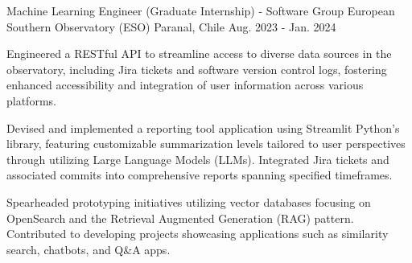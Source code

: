 

\begin{cventries}
  \cventry
    {Machine Learning Engineer (Graduate Internship) - Software Group} %
    {European Southern Observatory (ESO)} %
    {Paranal, Chile} %
    {Aug. 2023 - Jan. 2024} %
    {
      \begin{cvitems} %
        \item {Engineered a RESTful API to streamline access to diverse data sources in the observatory, including Jira tickets and software version control logs, fostering enhanced accessibility and integration of user information across various platforms.}
        \item {Devised and implemented a reporting tool application using Streamlit Python's library, featuring customizable summarization levels tailored to user perspectives through utilizing Large Language Models (LLMs). Integrated Jira tickets and associated commits into comprehensive reports spanning specified timeframes.}
	\item {Spearheaded prototyping initiatives utilizing vector databases focusing on OpenSearch and the Retrieval Augmented Generation (RAG) pattern. Contributed to developing projects showcasing applications such as similarity search, chatbots, and Q\&A apps.}
      \end{cvitems}
    }


\end{cventries}
